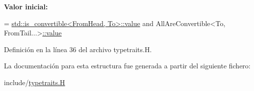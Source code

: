 {\bfseries Valor inicial\+:}
\begin{DoxyCode}
=
      \hyperlink{namespace_designar_a7dd2a7b6d96f664ce612b506c8eb2fb8}{std::is\_convertible<FromHead, To>::value} and
      AllAreConvertible<To, FromTail...>\hyperlink{struct_designar_1_1_all_are_convertible_a698b71c73875452298bc2e96935240c3}{::value}
\end{DoxyCode}


Definición en la línea 36 del archivo typetraits.\+H.



La documentación para esta estructura fue generada a partir del siguiente fichero\+:\begin{DoxyCompactItemize}
\item 
include/\hyperlink{typetraits_8_h}{typetraits.\+H}\end{DoxyCompactItemize}

